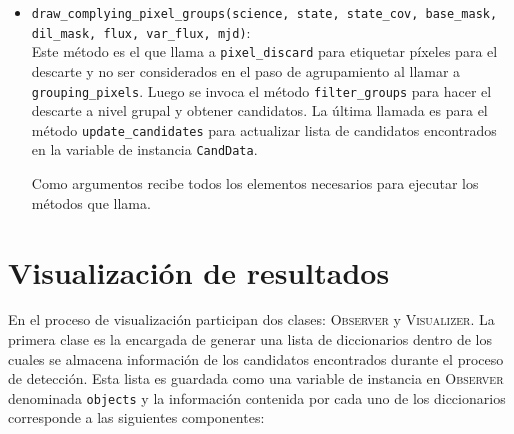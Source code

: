 \begin{itemize}
\item \texttt{draw\_complying\_pixel\_groups(science, state, state\_cov, base\_mask, dil\_mask, flux, var\_flux, mjd)}:\\
Este m\'etodo es el que llama a \texttt{pixel\_discard} para etiquetar p\'ixeles para el descarte y no ser considerados en el paso de agrupamiento al llamar a \texttt{grouping\_pixels}. Luego se invoca el m\'etodo \texttt{filter\_groups} para hacer el descarte a nivel grupal y obtener candidatos. La \'ultima llamada es para el m\'etodo \texttt{update\_candidates} para actualizar lista de candidatos encontrados en la variable de instancia \texttt{CandData}.
\bigskip

Como argumentos recibe todos los elementos necesarios para ejecutar los m\'etodos que llama.

\end{itemize}

\section{Visualizaci\'on de resultados}
En el proceso de visualizaci\'on participan dos clases: \textsc{Observer} y \textsc{Visualizer}. La primera clase es la encargada de generar una lista de diccionarios dentro de los cuales se almacena informaci\'on de los candidatos encontrados durante el proceso de detecci\'on. Esta lista es guardada como una variable de instancia en \textsc{Observer} denominada \texttt{objects} y la informaci\'on contenida por cada uno de los diccionarios corresponde a las siguientes componentes:

